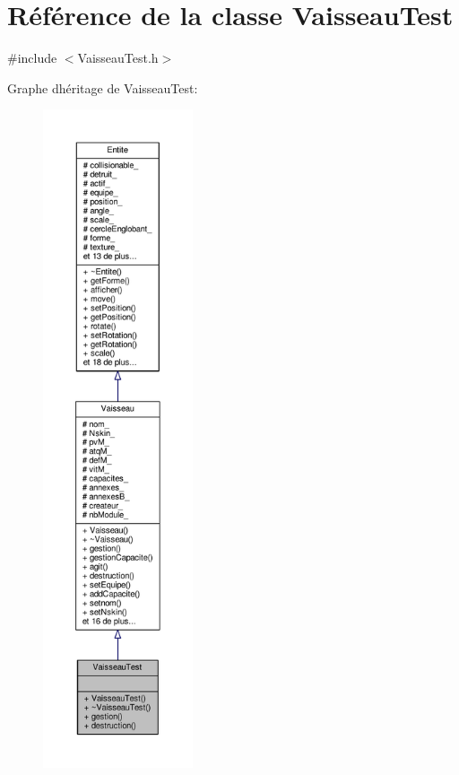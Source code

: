 \hypertarget{class_vaisseau_test}{}\section{Référence de la classe Vaisseau\+Test}
\label{class_vaisseau_test}


{\ttfamily \#include $<$Vaisseau\+Test.\+h$>$}



Graphe d\textquotesingle{}héritage de Vaisseau\+Test\+:\nopagebreak
\begin{figure}[H]
\begin{center}
\leavevmode
\includegraphics[height=550pt]{class_vaisseau_test__inherit__graph}
\end{center}
\end{figure}


